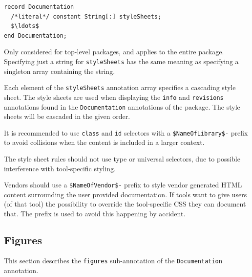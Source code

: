 \begin{annotationdefinition*}[styleSheets]\label{modelica:Documentation.styleSheets}
\begin{synopsis}\begin{lstlisting}
record Documentation
  /*literal*/ constant String[:] styleSheets;
  $\ldots$
end Documentation;
\end{lstlisting}\end{synopsis}
\begin{semantics}
Only considered for top-level packages, and applies to the entire package.
Specifying just a string for \lstinline!styleSheets! has the same meaning as specifying a singleton array containing the string.

Each element of the \lstinline!styleSheets! annotation array specifies a cascading style sheet.
The style sheets are used when displaying the \lstinline!info! and \lstinline!revisions! annotations found in the \lstinline!Documentation! annotations of the package.
The style sheets will be cascaded in the given order.

\begin{nonnormative}
It is recommended to use \lstinline[language=CSS]!class! and \lstinline[language=CSS]!id! selectors with a \lstinline[language=CSS]!$NameOfLibrary$-! prefix to avoid collisions when the content is included in a larger context.
\end{nonnormative}
The style sheet rules should not use type or universal selectors, due to possible interference with tool-specific styling.

Vendors should use a \lstinline[language=CSS]!$NameOfVendor$-! prefix to style vendor generated HTML content surrounding the user provided documentation.
If tools want to give users (of that tool) the possibility to override the tool-specific CSS they can document that.
The prefix is used to avoid this happening by accident.
\end{semantics}
\end{annotationdefinition*}


\subsection{Figures}\label{annotations-for-figures}\label{figures}

This section describes the \lstinline!figures! sub-annotation of the \lstinline!Documentation! annotation.

